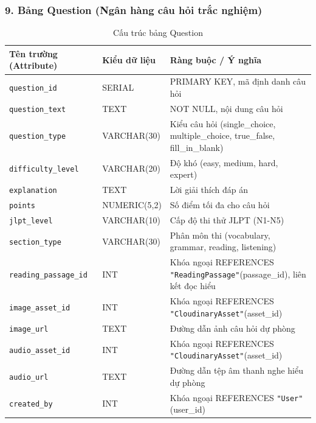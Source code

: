 \documentclass[../DoAn.tex]{subfiles}
\begin{document}
\subsubsection*{9. Bảng Question (Ngân hàng câu hỏi trắc nghiệm)}
\begin{table}[H]
\centering
\footnotesize
\renewcommand{\arraystretch}{1.2}
\begin{tabular}{|p{4.2cm}|p{3.2cm}|p{7.1cm}|}
\hline
\textbf{Tên trường (Attribute)} & \textbf{Kiểu dữ liệu} & \textbf{Ràng buộc / Ý nghĩa} \\
\hline
\texttt{question\_id} & SERIAL & PRIMARY KEY, mã định danh câu hỏi \\
\hline
\texttt{question\_text} & TEXT & NOT NULL, nội dung câu hỏi \\
\hline
\texttt{question\_type} & VARCHAR(30) & Kiểu câu hỏi (single\_choice, multiple\_choice, true\_false, fill\_in\_blank) \\
\hline
\texttt{difficulty\_level} & VARCHAR(20) & Độ khó (easy, medium, hard, expert) \\
\hline
\texttt{explanation} & TEXT & Lời giải thích đáp án \\
\hline
\texttt{points} & NUMERIC(5,2) & Số điểm tối đa cho câu hỏi \\
\hline
\texttt{jlpt\_level} & VARCHAR(10) & Cấp độ thi thử JLPT (N1-N5) \\
\hline
\texttt{section\_type} & VARCHAR(30) & Phân môn thi (vocabulary, grammar, reading, listening) \\
\hline
\texttt{reading\_passage\_id} & INT & Khóa ngoại REFERENCES \texttt{"ReadingPassage"}(passage\_id), liên kết đọc hiểu \\
\hline
\texttt{image\_asset\_id} & INT & Khóa ngoại REFERENCES \texttt{"CloudinaryAsset"}(asset\_id) \\
\hline
\texttt{image\_url} & TEXT & Đường dẫn ảnh câu hỏi dự phòng \\
\hline
\texttt{audio\_asset\_id} & INT & Khóa ngoại REFERENCES \texttt{"CloudinaryAsset"}(asset\_id) \\
\hline
\texttt{audio\_url} & TEXT & Đường dẫn tệp âm thanh nghe hiểu dự phòng \\
\hline
\texttt{created\_by} & INT & Khóa ngoại REFERENCES \texttt{"User"}(user\_id) \\
\hline
\end{tabular}
\caption{Cấu trúc bảng Question}
\label{tab:schema_question}
\end{table}
\end{document}
